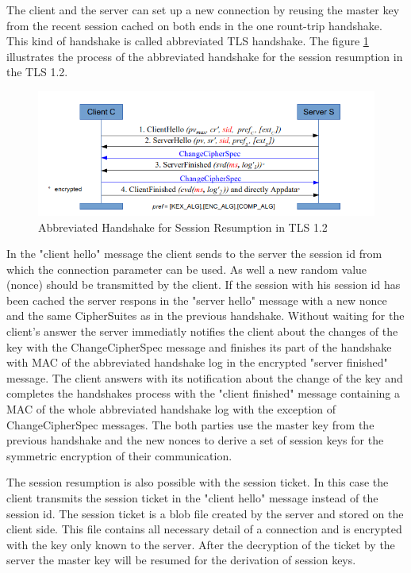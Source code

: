 The client and the server can set up a new connection by reusing the master key from the recent session cached on both ends in the one rount-trip handshake. This kind of handshake is called abbreviated TLS handshake. The figure \ref{fig:resumption1_2} illustrates the process of the abbreviated handshake for the session resumption in the TLS 1.2.

\begin{figure}[H]
	\centering
		\includegraphics[scale=0.85]{images/resumption1_2.png}
	\caption{Abbreviated Handshake for Session Resumption in TLS 1.2 \cite{Hassenstein}}
	\label{fig:resumption1_2}
\end{figure}

In the "client hello" message the client sends to the server the session id from which the connection parameter can be used. As well a new random value (nonce) should be transmitted by the client. If the session with his session id has been cached the server respons in the "server hello" message with a new nonce and the same CipherSuites as in the previous handshake. Without waiting for the client's answer the server immediatly notifies the client about the changes of the key with the ChangeCipherSpec message and finishes its part of the handshake with MAC of the abbreviated handshake log in the encrypted "server finished" message. The client answers with its notification about the change of the key and completes the handshakes process with the "client finished" message containing a MAC of the whole abbreviated handshake log with the exception of ChangeCipherSpec messages. The both parties use the master key from the previous handshake and the new nonces to derive a set of session keys for the symmetric encryption of their communication.

The session resumption is also possible with the session ticket. In this case the client transmits the session ticket in the "client hello" message instead of the session id. The session ticket is a blob file created by the server and stored on the client side. This file contains all necessary detail of a connection and is encrypted with the key only known to the server. After the decryption of the ticket by the server the master key will be resumed for the derivation of session keys.

